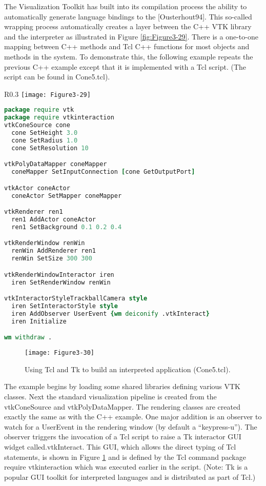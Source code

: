 The Visualization Toolkit has built into its compilation process the ability to automatically generate language bindings to the [Ousterhout94]. This so-called wrapping process automatically creates a layer between the C++ VTK library and the interpreter as illustrated in Figure \ref{fig:Figure3-29}. There is a one-to-one mapping between C++ methods and Tcl C++ functions for most objects and methods in the system. To demonstrate this, the following example repeats the previous C++ example except that it is implemented with a Tcl script. (The script can be found in Cone5.tcl).

\begin{wrapfigure}{R}{0.3\linewidth}
  \centering
  \texttt{[image: Figure3-29]}\\
  \caption{In VTK the C++ library is automatically wrapped with the interpreted languages Tcl, Python, and Java.}\label{fig:Figure3-29}
\end{wrapfigure}

\begin{lstlisting}[language=TCL, caption={Cone5.tcl}]
package require vtk
package require vtkinteraction
vtkConeSource cone
  cone SetHeight 3.0
  cone SetRadius 1.0
  cone SetResolution 10

vtkPolyDataMapper coneMapper
  coneMapper SetInputConnection [cone GetOutputPort]

vtkActor coneActor
  coneActor SetMapper coneMapper

vtkRenderer ren1
  ren1 AddActor coneActor
  ren1 SetBackground 0.1 0.2 0.4

vtkRenderWindow renWin
  renWin AddRenderer ren1
  renWin SetSize 300 300

vtkRenderWindowInteractor iren
  iren SetRenderWindow renWin

vtkInteractorStyleTrackballCamera style
  iren SetInteractorStyle style
  iren AddObserver UserEvent {wm deiconify .vtkInteract}
  iren Initialize

wm withdraw .
\end{lstlisting}

\begin{figure}[!htb]
  \centering
  \texttt{[image: Figure3-30]}\\
  \caption{Using Tcl and Tk to build an interpreted application (Cone5.tcl).}\label{fig:Figure3-30}
\end{figure}

The example begins by loading some shared libraries defining various VTK classes. Next the standard visualization pipeline is created from the vtkConeSource and vtkPolyDataMapper. The rendering classes are created exactly the same as with the C++ example. One major addition is an observer to watch for a UserEvent in the rendering window (by default a ``keypress-u''). The observer triggers the invocation of a Tcl script to raise a Tk interactor GUI widget called.vtkInteract. This GUI, which allows the direct typing of Tcl statements, is shown in Figure \ref{fig:Figure3-30} and is defined by the Tcl command package require vtkinteraction which was executed earlier in the script. (Note: Tk is a popular GUI toolkit for interpreted languages and is distributed as part of Tcl.) 

